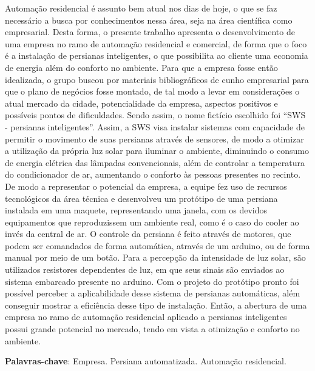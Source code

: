 \documentclass[article,12pt,onesidea,4paper,english,brazil]{abntex2}
\begin{document}
	\noindent Automação residencial é assunto bem atual nos dias de hoje, o que se faz necessário a busca por conhecimentos nessa área, seja na área científica como empresarial. Desta forma, o presente trabalho apresenta o desenvolvimento de uma empresa no ramo de automação residencial e comercial, de forma que o foco é a instalação de persianas inteligentes, o que possibilita ao cliente uma economia de energia além do conforto no ambiente. Para que a empresa fosse então idealizada, o grupo buscou por materiais bibliográficos de cunho empresarial para que o plano de negócios fosse montado, de tal modo a levar em considerações o atual mercado da cidade, potencialidade da empresa, aspectos positivos e possíveis pontos de dificuldades. Sendo assim, o nome fictício escolhido foi “SWS - persianas inteligentes”. Assim, a SWS visa instalar sistemas com capacidade de permitir o movimento de suas persianas através de sensores, de modo a otimizar a utilização da própria luz solar para iluminar o ambiente, diminuindo o consumo de energia elétrica das lâmpadas convencionais, além de controlar a temperatura do condicionador de ar, aumentando o conforto às pessoas presentes no recinto. De modo a representar o potencial da empresa, a equipe fez uso de recursos tecnológicos da área técnica e desenvolveu um protótipo de uma persiana instalada em uma maquete, representando uma janela, com os devidos equipamentos que reproduzissem um ambiente real, como é o caso do cooler ao invés da central de ar. O controle da persiana é feito através de motores, que podem ser comandados de forma automática, através de um arduino, ou de forma manual por meio de um botão. Para a percepção da intensidade de luz solar, são utilizados resistores dependentes de luz, em que seus sinais são enviados ao sistema embarcado presente no arduino. Com o projeto do protótipo pronto foi possível perceber a aplicabilidade desse sistema de persianas automáticas, além conseguir mostrar a eficiência desse tipo de instalação. Então, a abertura de uma empresa no ramo de automação residencial aplicado a persianas inteligentes possui grande potencial no mercado, tendo em vista a otimização e conforto no ambiente.
	
	\vspace{\onelineskip}
	
	\noindent
	\textbf{Palavras-chave}: Empresa. Persiana automatizada. Automação residencial.
	
\end{document}
